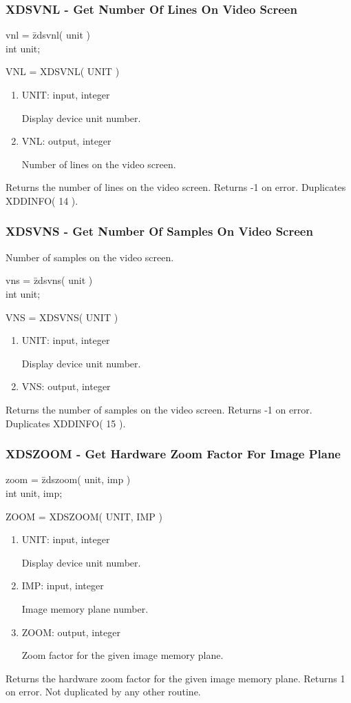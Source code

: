 \subsubsection{XDSVNL - Get Number Of Lines On Video Screen}
\begin{tabbing}
vnl = \=zdsvnl( unit )\\
\>int  unit;\\
\end{tabbing}
VNL = XDSVNL( UNIT )
\begin{enumerate}
\item UNIT:  input, integer

Display device unit number.
\item VNL:  output, integer

Number of lines on the video screen.
\end{enumerate}
Returns the number of lines on the video screen.  Returns -1 on error.
Duplicates XDDINFO( 14 ).
\newpage
\subsubsection{XDSVNS - Get Number Of Samples On Video Screen}

Number of samples on the video screen.
\begin{tabbing}
vns = \=zdsvns( unit )\\
\>int  unit;\\
\end{tabbing}
VNS = XDSVNS( UNIT )
\begin{enumerate}
\item UNIT:  input, integer

Display device unit number.
\item VNS:  output, integer
\end{enumerate}
Returns the number of samples on the video screen.  Returns -1 on error.
Duplicates XDDINFO( 15 ).
\newpage
\subsubsection{XDSZOOM - Get Hardware Zoom Factor For Image Plane}
\begin{tabbing}
zoom = \=zdszoom( unit, imp )\\
\>int  unit, imp;\\
\end{tabbing}
ZOOM = XDSZOOM( UNIT, IMP )
\begin{enumerate}
\item UNIT:  input, integer

Display device unit number.
\item IMP:  input, integer

Image memory plane number.
\item ZOOM:  output, integer

Zoom factor for the given image memory plane.
\end{enumerate}
Returns the hardware zoom factor for the given image memory plane.
Returns 1 on error.  Not duplicated by any other routine.
\newpage
